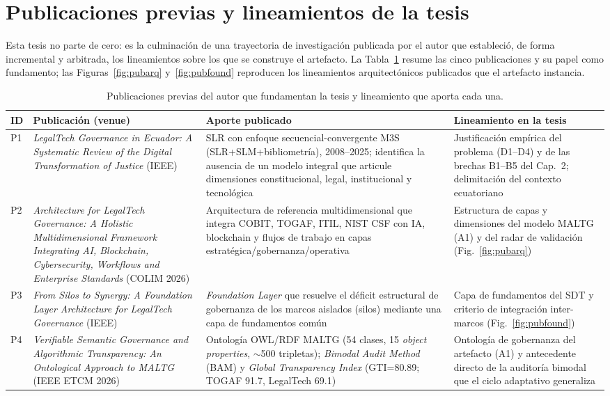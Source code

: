 \documentclass[a4paper,openany,12pt]{book}
\begin{document}
\section{Publicaciones previas y lineamientos de la tesis}
Esta tesis no parte de cero: es la culminación de una trayectoria de investigación publicada por el autor que estableció, de forma incremental y arbitrada, los lineamientos sobre los que se construye el artefacto. La Tabla~\ref{tab:pubs} resume las cinco publicaciones y su papel como fundamento; las Figuras~\ref{fig:pubarq} y~\ref{fig:pubfound} reproducen los lineamientos arquitectónicos publicados que el artefacto instancia.

\begin{table}[H]\centering\footnotesize
\caption{Publicaciones previas del autor que fundamentan la tesis y lineamiento que aporta cada una.}\label{tab:pubs}
\begin{tabular}{p{0.7cm}p{5.2cm}p{3.4cm}p{4.0cm}}\toprule
\textbf{ID} & \textbf{Publicación (venue)} & \textbf{Aporte publicado} & \textbf{Lineamiento en la tesis} \\ \midrule
P1 & \textit{LegalTech Governance in Ecuador: A Systematic Review of the Digital Transformation of Justice} (IEEE)~\cite{paccha2025slr} & SLR con enfoque secuencial-convergente M3S (SLR+SLM+bibliometría), 2008--2025; identifica la ausencia de un modelo integral que articule dimensiones constitucional, legal, institucional y tecnológica & Justificación empírica del problema (D1--D4) y de las brechas B1--B5 del Cap.~2; delimitación del contexto ecuatoriano \\
P2 & \textit{Architecture for LegalTech Governance: A Holistic Multidimensional Framework Integrating AI, Blockchain, Cybersecurity, Workflows and Enterprise Standards} (COLIM 2026)~\cite{paccha2026colim} & Arquitectura de referencia multidimensional que integra COBIT, TOGAF, ITIL, NIST CSF con IA, blockchain y flujos de trabajo en capas estratégica/gobernanza/operativa & Estructura de capas y dimensiones del modelo MALTG (A1) y del radar de validación (Fig.~\ref{fig:pubarq}) \\
P3 & \textit{From Silos to Synergy: A Foundation Layer Architecture for LegalTech Governance} (IEEE)~\cite{paccha2026silos} & \textit{Foundation Layer} que resuelve el déficit estructural de gobernanza de los marcos aislados (silos) mediante una capa de fundamentos común & Capa de fundamentos del SDT y criterio de integración inter-marcos (Fig.~\ref{fig:pubfound}) \\
P4 & \textit{Verifiable Semantic Governance and Algorithmic Transparency: An Ontological Approach to MALTG} (IEEE ETCM 2026)~\cite{paccha2026etcm} & Ontología OWL/RDF MALTG (54 clases, 15 \textit{object properties}, $\sim$500 tripletas); \textit{Bimodal Audit Method} (BAM) y \textit{Global Transparency Index} (GTI=80.89; TOGAF 91.7, LegalTech 69.1) & Ontología de gobernanza del artefacto (A1) y antecedente directo de la auditoría bimodal que el ciclo adaptativo generaliza \\

\end{tabular}
\end{table}
\end{document}
